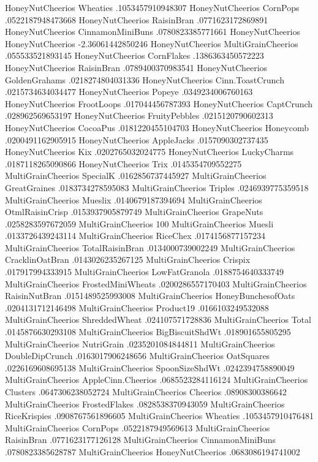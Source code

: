HoneyNutCheerios	Wheaties	.1053457910948307
HoneyNutCheerios	CornPops	.0522187948473668
HoneyNutCheerios	RaisinBran	.0771623172869891
HoneyNutCheerios	CinnamonMiniBuns	.0780823385771661
HoneyNutCheerios	HoneyNutCheerios	-2.36061442850246
HoneyNutCheerios	MultiGrainCheerios	.055533521893145
HoneyNutCheerios	CornFlakes	.1386363450572223
HoneyNutCheerios	RaisinBran	.0789400370983541
HoneyNutCheerios	GoldenGrahams	.0218274804031336
HoneyNutCheerios	Cinn.ToastCrunch	.0215734634034477
HoneyNutCheerios	Popeye	.0349234006760163
HoneyNutCheerios	FrootLoops	.017044456787393
HoneyNutCheerios	CaptCrunch	.028962569653197
HoneyNutCheerios	FruityPebbles	.0215120790602313
HoneyNutCheerios	CocoaPus	.0181220455104703
HoneyNutCheerios	Honeycomb	.0200491162905915
HoneyNutCheerios	AppleJacks	.0157090302737435
HoneyNutCheerios	Kix	.0202765032024775
HoneyNutCheerios	LuckyCharms	.0187118265090866
HoneyNutCheerios	Trix	.0145354709552275
MultiGrainCheerios	SpecialK	.0162856737445927
MultiGrainCheerios	GreatGraines	.0183734278595083
MultiGrainCheerios	Triples	.0246939775359518
MultiGrainCheerios	Mueslix	.0140679187394694
MultiGrainCheerios	OtmlRaisinCrisp	.0153937905879749
MultiGrainCheerios	GrapeNuts	.0258283597672059
MultiGrainCheerios	100%
MultiGrainCheerios	Muesli	.0133726439243114
MultiGrainCheerios	RiceChex	.0174156877157234
MultiGrainCheerios	TotalRaisinBran	.0134000739002249
MultiGrainCheerios	CracklinOatBran	.0143026235267125
MultiGrainCheerios	Crispix	.017917994333915
MultiGrainCheerios	LowFatGranola	.0188754640333749
MultiGrainCheerios	FrostedMiniWheats	.0200286557170403
MultiGrainCheerios	RaisinNutBran	.0151489525993008
MultiGrainCheerios	HoneyBunchesofOats	.0204131712146498
MultiGrainCheerios	Product19	.0166103249532088
MultiGrainCheerios	ShreddedWheat	.024107571728836
MultiGrainCheerios	Total	.0145876630293108
MultiGrainCheerios	BigBiscuitShdWt	.018901655805295
MultiGrainCheerios	NutriGrain	.0235201084844811
MultiGrainCheerios	DoubleDipCrunch	.0163017906248656
MultiGrainCheerios	OatSquares	.0226169608695138
MultiGrainCheerios	SpoonSizeShdWt	.0242394758890049
MultiGrainCheerios	AppleCinn.Cheerios	.0685523284116124
MultiGrainCheerios	Clusters	.0647306238052724
MultiGrainCheerios	Cheerios	.08908300386642
MultiGrainCheerios	FrostedFlakes	.0828538370943059
MultiGrainCheerios	RiceKrispies	.0908767561896605
MultiGrainCheerios	Wheaties	.1053457910476481
MultiGrainCheerios	CornPops	.0522187949569613
MultiGrainCheerios	RaisinBran	.0771623177126128
MultiGrainCheerios	CinnamonMiniBuns	.0780823385628787
MultiGrainCheerios	HoneyNutCheerios	.0683086194741002
